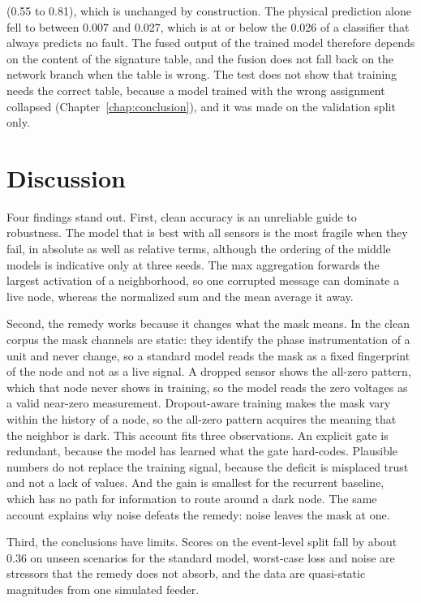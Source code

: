 \documentclass[MTech]{ugthesis}
\begin{document}
(0.55 to 0.81), which is unchanged by construction. The physical prediction alone fell to between 0.007 and 0.027, which is at or below the 0.026 of a classifier that always predicts no fault. The fused output of the trained model therefore depends on the content of the signature table, and the fusion does not fall back on the network branch when the table is wrong. The test does not show that training needs the correct table, because a model trained with the wrong assignment collapsed (Chapter~\ref{chap:conclusion}), and it was made on the validation split only.

\section{Discussion}

Four findings stand out. First, clean accuracy is an unreliable guide to robustness. The model that is best with all sensors is the most fragile when they fail, in absolute as well as relative terms, although the ordering of the middle models is indicative only at three seeds. The max aggregation forwards the largest activation of a neighborhood, so one corrupted message can dominate a live node, whereas the normalized sum and the mean average it away.

Second, the remedy works because it changes what the mask means. In the clean corpus the mask channels are static: they identify the phase instrumentation of a unit and never change, so a standard model reads the mask as a fixed fingerprint of the node and not as a live signal. A dropped sensor shows the all-zero pattern, which that node never shows in training, so the model reads the zero voltages as a valid near-zero measurement. Dropout-aware training makes the mask vary within the history of a node, so the all-zero pattern acquires the meaning that the neighbor is dark. This account fits three observations. An explicit gate is redundant, because the model has learned what the gate hard-codes. Plausible numbers do not replace the training signal, because the deficit is misplaced trust and not a lack of values. And the gain is smallest for the recurrent baseline, which has no path for information to route around a dark node. The same account explains why noise defeats the remedy: noise leaves the mask at one.

Third, the conclusions have limits. Scores on the event-level split fall by about 0.36 on unseen scenarios for the standard model, worst-case loss and noise are stressors that the remedy does not absorb, and the data are quasi-static magnitudes from one simulated feeder.
\end{document}

